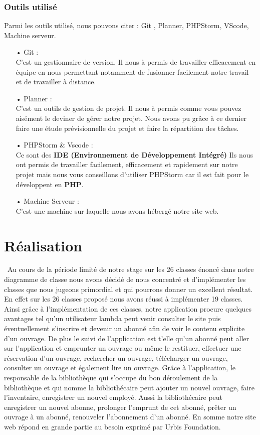 \documentclass[12pt,a4paper]{article}
\begin{document}
\subsubsection{Outils utilisé}
Parmi les outils utilisé, nous pouvons citer : Git , Planner, PHPStorm, VScode, Machine serveur.
\begin{itemize}
\item[•] Git : \\
C'est un gestionnaire de version. Il nous à permis de travailler efficacement en équipe en nous
permettant notamment de fusionner facilement notre travail et de travailler à distance. 
\item[•] Planner : \\
C'est un outils de gestion de projet. Il nous à permis comme vous pouvez aisément le deviner de 
gérer notre projet. Nous avons pu grâce à ce dernier faire une étude prévisionnelle du projet et faire
la répartition des tâches.
\item[•] PHPStorm \& Vscode : \\
Ce sont des \textbf{IDE (Environnement de Développement Intégré)} Ils nous ont permis de
travailler facilement, efficacement et rapidement sur notre projet mais nous vous conseillons 
d'utiliser PHPStorm car il est fait pour le développent en \textbf{PHP}.
\item[•] Machine Serveur : \\
C'est une machine sur laquelle nous avons hébergé notre site web.
\end{itemize}

\section{Réalisation}
\ Au cours de la période limité de notre stage sur les 26 classes énoncé dans notre diagramme de classe nous avons décidé de nous concentré et d'implémenter les classes que nous jugeons primordial et qui pourrons donner un excellent résultat. En effet sur les 26 classes proposé nous avons réussi à implémenter 19 classes. Ainsi grâce à l'implémentation de ces classes, notre application procure quelques avantages tel qu'un utilisateur lambda peut venir consulter le site puis éventuellement s'inscrire et devenir un abonné afin de voir le contenu explicite d'un ouvrage. De plus le suivi de l'application est t'elle qu'un abonné peut aller sur l'application et emprunter un ouvrage ou même le restituer, effectuer une réservation d'un ouvrage, rechercher un ouvrage, télécharger un ouvrage, consulter un ouvrage et également lire un ouvrage. Grâce à l'application, le responsable de la bibliothèque qui s'occupe du bon déroulement de la bibliothèque et qui nomme la bibliothécaire peut ajouter un nouvel ouvrage, faire l'inventaire, enregistrer un nouvel employé. Aussi la bibliothécaire peut enregistrer un nouvel abonne, prolonger l'emprunt de cet abonné, prêter un ouvrage à un abonné, renouveler l'abonnement d'un abonné. En somme notre site web répond en grande partie au besoin exprimé par Urbis Foundation.
\end{document}
